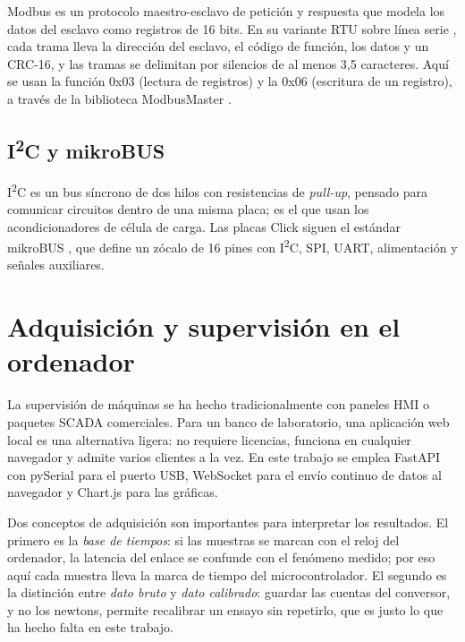 Modbus \cite{modbusapp} es un protocolo maestro-esclavo de petición y respuesta que modela los datos
del esclavo como registros de 16 bits. En su variante RTU sobre línea serie \cite{modbusserial},
cada trama lleva la dirección del esclavo, el código de función, los datos y un CRC-16, y las tramas
se delimitan por silencios de al menos 3,5 caracteres. Aquí se usan la función 0x03 (lectura de
registros) y la 0x06 (escritura de un registro), a través de la biblioteca ModbusMaster
\cite{modbusmaster}.

\subsection{I\textsuperscript{2}C y mikroBUS}

I\textsuperscript{2}C \cite{i2cspec} es un bus síncrono de dos hilos con resistencias de
\emph{pull-up}, pensado para comunicar circuitos dentro de una misma placa; es el que usan los
acondicionadores de célula de carga. Las placas Click siguen el estándar mikroBUS \cite{mikrobus},
que define un zócalo de 16 pines con I\textsuperscript{2}C, SPI, UART, alimentación y señales
auxiliares.

\section{Adquisición y supervisión en el ordenador}

La supervisión de máquinas se ha hecho tradicionalmente con paneles HMI o paquetes SCADA
comerciales. Para un banco de laboratorio, una aplicación web local es una alternativa ligera: no
requiere licencias, funciona en cualquier navegador y admite varios clientes a la vez. En este
trabajo se emplea FastAPI \cite{fastapi} con pySerial \cite{pyserial} para el puerto USB, WebSocket
\cite{rfc6455} para el envío continuo de datos al navegador y Chart.js \cite{chartjs} para las
gráficas.

Dos conceptos de adquisición son importantes para interpretar los resultados. El primero es la
\emph{base de tiempos}: si las muestras se marcan con el reloj del ordenador, la latencia del enlace
se confunde con el fenómeno medido; por eso aquí cada muestra lleva la marca de tiempo del
microcontrolador. El segundo es la distinción entre \emph{dato bruto} y \emph{dato calibrado}:
guardar las cuentas del conversor, y no los newtons, permite recalibrar un ensayo sin repetirlo,
que es justo lo que ha hecho falta en este trabajo.
